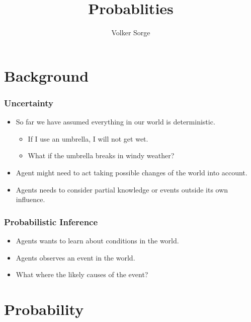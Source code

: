 \documentclass[xcolor=dvipsnames,ignorenonframetext]{beamer}
\title[Intro to AI: Lecture \Lnum]{
  Probablities%
}
\author{Volker Sorge}
\date{}
\begin{document}
\begin{frame}
  \maketitle
\end{frame}
\tableofcontents

\section{Background}

\begin{frame}
  \frametitle{Uncertainty}
  \begin{itemize}
  \item So far we have assumed everything in our world is deterministic.
    \begin{itemize}
    \item If I use an umbrella, I will not get wet.
    \item What if the umbrella breaks in windy weather?
    \end{itemize}
  \end{itemize}
  \begin{itemize}
  \item Agent might need to act taking possible changes of the world into
    account.
  \item Agents needs to consider partial knowledge or events outside its own
    influence.
  \end{itemize}
\end{frame}


\begin{frame}
  \frametitle{Probabilistic Inference}
  \begin{itemize}
  \item Agents wants to learn about conditions in the world.
  \item Agents observes an event in the world.
  \item What where the likely causes of the event?
  \end{itemize}
\end{frame}

\section{Probability}
\end{document}
